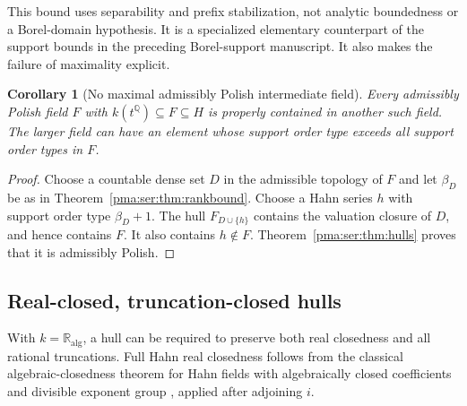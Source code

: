 \documentclass[11pt]{article}
\numberwithin{equation}{section}
\newtheorem{corollary}[corollary]{Corollary}
\theoremstyle{definition}
\theoremstyle{remark}
\newcommand{\Q}{\mathbb Q}
\newcommand{\ka}{\mathbb R_{\mathrm{alg}}}
\begin{document}
This bound uses separability and prefix stabilization, not analytic
boundedness or a Borel-domain hypothesis. It is a specialized elementary
counterpart of the support bounds in the preceding Borel-support manuscript.
It also makes the failure of maximality explicit.

\begin{corollary}[No maximal admissibly Polish intermediate field]
\label{pma:ser:cor:nomax}
Every admissibly Polish field $F$ with
$k(t^\Q)\subseteq F\subseteq H$ is properly contained in another such
field. The larger field can have an element whose support order type exceeds
all support order types in $F$.
\end{corollary}
\begin{proof}
Choose a countable dense set $D$ in the admissible topology of $F$ and let
$\beta_D$ be as in Theorem~\ref{pma:ser:thm:rankbound}. Choose a Hahn series $h$
with support order type $\beta_D+1$.
The hull $F_{D\cup\{h\}}$ contains the valuation closure of $D$, and hence
contains $F$. It also contains $h\notin F$. Theorem~\ref{pma:ser:thm:hulls} proves
that it is admissibly Polish.
\end{proof}

\subsection{Real-closed, truncation-closed hulls}

With $k=\ka$, a hull can be required to preserve both real closedness and
all rational truncations. Full Hahn real closedness follows from the
classical algebraic-closedness theorem for Hahn fields with algebraically
closed coefficients and divisible exponent group
\cite[Corollary~4]{Poonen}, applied after adjoining $i$.
\end{document}
